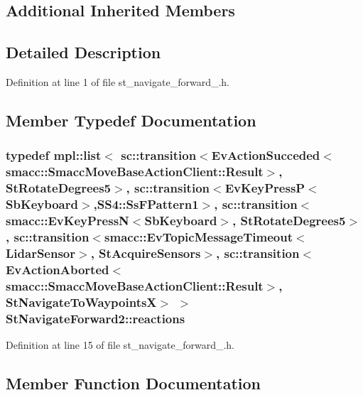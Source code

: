 \subsection*{Additional Inherited Members}


\subsection{Detailed Description}


Definition at line 1 of file st\+\_\+navigate\+\_\+forward\+\_.\+h.



\subsection{Member Typedef Documentation}
\subsubsection[{\texorpdfstring{reactions}{reactions}}]{\setlength{\rightskip}{0pt plus 5cm}typedef mpl\+::list$<$ sc\+::transition$<$Ev\+Action\+Succeded$<$smacc\+::\+Smacc\+Move\+Base\+Action\+Client\+::\+Result$>$, {\bf St\+Rotate\+Degrees5}$>$, sc\+::transition$<$Ev\+Key\+PressP$<$Sb\+Keyboard$>$,{\bf S\+S4\+::\+Ss\+F\+Pattern1}$>$, sc\+::transition$<${\bf smacc\+::\+Ev\+Key\+PressN}$<$Sb\+Keyboard$>$, {\bf St\+Rotate\+Degrees5}$>$, sc\+::transition$<${\bf smacc\+::\+Ev\+Topic\+Message\+Timeout}$<${\bf Lidar\+Sensor}$>$, {\bf St\+Acquire\+Sensors}$>$, sc\+::transition$<$Ev\+Action\+Aborted$<$smacc\+::\+Smacc\+Move\+Base\+Action\+Client\+::\+Result$>$, {\bf St\+Navigate\+To\+WaypointsX}$>$ $>$ {\bf St\+Navigate\+Forward2\+::reactions}}\hypertarget{structStNavigateForward2_ac2745a7f9185d2901525ff3ed95b854a}{}\label{structStNavigateForward2_ac2745a7f9185d2901525ff3ed95b854a}


Definition at line 15 of file st\+\_\+navigate\+\_\+forward\+\_.\+h.



\subsection{Member Function Documentation}
